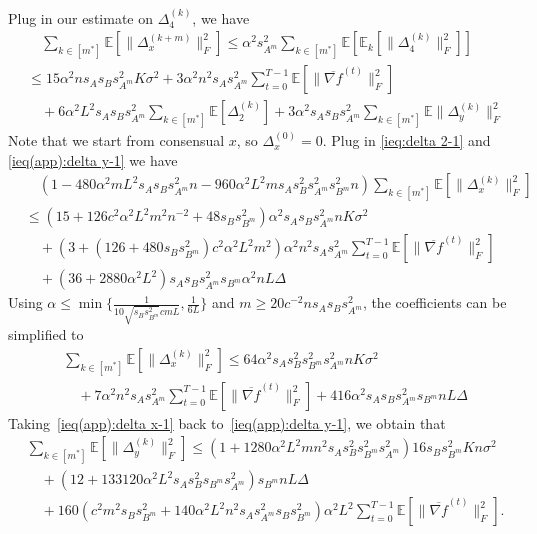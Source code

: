 \documentclass[10pt]{article}
\newcommand{\EE}{\mathbb{E}}
\newcommand{\norm}[1]{\| #1 \|}
\begin{document}
Plug in our estimate on $\Delta_4^{(k)}$, we have
\begin{align*}
    &\quad\sum_{k\in[m^*]}\EE[\norm{\Delta_x^{(k+m)}}_F^2]\le \alpha^2s_{A^m}^2\sum_{k\in[m^*]}\EE[\EE_k[\norm{\Delta_4^{(k)}}_F^2]]\\
    &\le 15\alpha^2ns_As_Bs_{A^m}^2K\sigma^2 + 3\alpha^2n^2s_As_{A^m}^2\sum_{t=0}^{T-1}\EE[\norm{\overline{\nabla f}^{(t)}}_F^2]\\
    &\quad+ 6\alpha^2L^2s_As_Bs_{A^m}^2\sum_{k\in[m^*]}\EE[\Delta_2^{(k)}]+ 3\alpha^2s_As_Bs_{A^m}^2 \sum_{k\in[m^*]}\EE\norm{\Delta_y^{(k)}}_F^2
\end{align*}
Note that we start from consensual $x$, so $\Delta_x^{(0)}=0$. Plug in \eqref{ieq:delta 2-1} and \eqref{ieq(app):delta y-1} we have
\begin{align*}
    &\quad(1-480\alpha^2mL^2s_As_Bs_{A^m}^2n-960\alpha^2L^2ms_As_B^2s_{A^m}^2s_{B^m}^2n)\sum_{k\in[m^*]}\EE[\norm{\Delta_x^{(k)}}_F^2]\\
    &\le (15+126c^2\alpha^2L^2m^2n^{-2}+48s_Bs_{B^m}^2)\alpha^2s_As_Bs_{A^m}^2nK\sigma^2 \\
    &\quad+ (3+(126+480s_Bs_{B^m}^2)c^2\alpha^2L^2 m^2)\alpha^2n^2s_As_{A^m}^2\sum_{t=0}^{T-1}\EE[\norm{\overline{\nabla f}^{(t)}}_F^2]\\
    &\quad+ (36+2880\alpha^2L^2) s_As_Bs_{A^m}^2s_{B^m}  \alpha^2nL\Delta
\end{align*}
Using $\alpha \le \min\{\frac{1}{10\sqrt{s_Bs_{B^m}^2}cmL},\frac{1}{6L}\}$ and $m\ge 20 c^{-2}ns_As_Bs_{A^m}^2$, the coefficients can be simplified to 
\begin{align}\label{ieq(app):delta x-1}
    &\sum_{k\in[m^*]}\EE[\norm{\Delta_x^{(k)}}_F^2]\le 64\alpha^2s_As_B^2s_{B^m}^2s_{A^m}^2nK\sigma^2\\
    &\quad+7\alpha^2n^2s_As_{A^m}^2\sum_{t=0}^{T-1}\EE[\norm{\overline{\nabla f}^{(t)}}_F^2]+416\alpha^2s_As_Bs_{A^m}^2s_{B^m}  nL\Delta\nonumber
\end{align}
Taking~\eqref{ieq(app):delta x-1} back to~\eqref{ieq(app):delta y-1}, we obtain that
\begin{align*}
    &\sum_{k\in[m^*]}\EE[\norm{\Delta_y^{(k)}}_F^2]\le  (1+1280\alpha^2L^2mn^2s_As_B^2s_{B^m}^2s_{A^m}^2)16s_Bs_{B^m}^2Kn\sigma^2\\
    &\quad+(12+133120\alpha^2L^2s_As_B^2s_{B^m}s_{A^m}^2)s_{B^m}nL\Delta \\
    &\quad+160(c^2m^2s_Bs_{B^m}^2+140\alpha^2L^2n^2s_As_{A^m}^2s_Bs_{B^m}^2)\alpha^2L^2\sum_{t=0}^{T-1}\EE[\norm{\overline{\nabla f}^{(t)}}_F^2].\nonumber
\end{align*}
\end{document}
